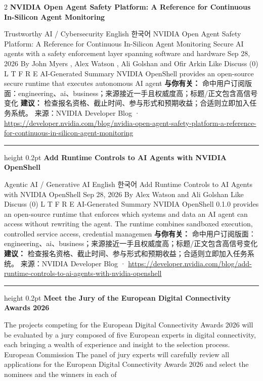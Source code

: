 \documentclass[10.5pt]{ctexart}
\begin{document}
\begin{multicols}{2}
{\large\bfseries NVIDIA Open Agent Safety Platform: A Reference for Continuous In-Silicon Agent Monitoring}\par
Trustworthy AI / Cybersecurity English 한국어 NVIDIA Open Agent Safety Platform: A Reference for Continuous In-Silicon Agent Monitoring Secure AI agents with a safety enforcement layer spanning software and hardware Sep 28, 2026 By John Myers , Alex Watson , Ali Golshan and Ofir Arkin Like Discuss (0) L T F R E AI-Generated Summary NVIDIA OpenShell provides an open-source secure runtime that executes autonomous AI agent
\textbf{与你有关：} 命中用户订阅版面：engineering、ai、business；来源接近一手且权威度高；标题/正文包含高信号变化
\textbf{建议：} 检查报名资格、截止时间、参与形式和预期收益；合适则立即加入任务系统。
{\footnotesize\color{ormuted} 来源：NVIDIA Developer Blog · \url{https://developer.nvidia.com/blog/nvidia-open-agent-safety-platform-a-reference-for-continuous-in-silicon-agent-monitoring}}
\vspace{2mm}
\hrule height 0.2pt
\vspace{2mm}
{\large\bfseries Add Runtime Controls to AI Agents with NVIDIA OpenShell}\par
Agentic AI / Generative AI English 한국어 Add Runtime Controls to AI Agents with NVIDIA OpenShell Sep 28, 2026 By Alex Watson and Ali Golshan Like Discuss (0) L T F R E AI-Generated Summary NVIDIA OpenShell 0.1.0 provides an open-source runtime that enforces which systems and data an AI agent can access without rewriting the agent. The runtime combines sandboxed execution, controlled service access, credential managemen
\textbf{与你有关：} 命中用户订阅版面：engineering、ai、business；来源接近一手且权威度高；标题/正文包含高信号变化
\textbf{建议：} 检查报名资格、截止时间、参与形式和预期收益；合适则立即加入任务系统。
{\footnotesize\color{ormuted} 来源：NVIDIA Developer Blog · \url{https://developer.nvidia.com/blog/add-runtime-controls-to-ai-agents-with-nvidia-openshell}}
\vspace{2mm}
\hrule height 0.2pt
\vspace{2mm}
{\large\bfseries Meet the Jury of the European Digital Connectivity Awards 2026}\par
The projects competing for the European Digital Connectivity Awards 2026 will be evaluated by a jury composed of five European experts in digital connectivity, each bringing a wealth of experience and insight to the selection process. European Commission The panel of jury experts will carefully review all applications for the European Digital Connectivity Awards 2026 and select the nominees and the winners in each of

\end{multicols}
\end{document}
